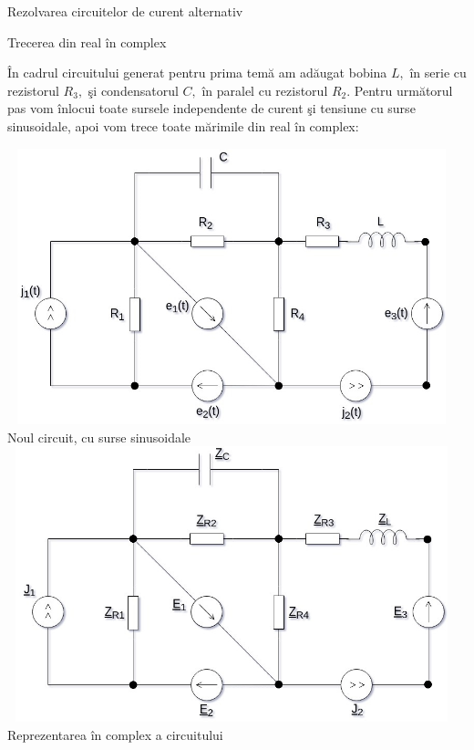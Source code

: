 \documentclass[a4paper]{article}
\begin{document}
\begin{section}{Rezolvarea circuitelor de curent alternativ}
\begin{subsection}{Trecerea din real \^ in complex\\}

	\^ In cadrul circuitului generat pentru prima tem\u a am ad\u augat bobina $ L, $ \^ in serie cu rezistorul $ R_3, $ \c si condensatorul $ C, $ \^ in paralel cu rezistorul $ R_2 $. Pentru urm\u atorul pas vom \^ inlocui toate sursele independente de curent \c si tensiune cu surse sinusoidale, apoi vom trece toate m\u arimile din real \^ in complex: 

\begin{center} 
	\includegraphics[width=13cm, height=8cm]{circuitsin.jpg} \\ 
	Noul circuit, cu surse sinusoidale \\[1.425cm]
	\includegraphics[width=13cm, height=8cm]{circuitC.jpg} \\
	Reprezentarea \^ in complex a circuitului  \\[1cm] 
\end{center}


\end{subsection}
\end{section}
\end{document}
